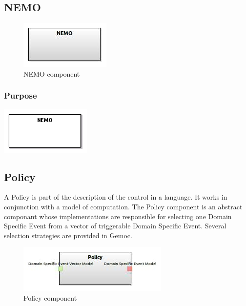 \documentclass{gemoc} %
\begin{document}
\subsection{NEMO}

\begin{figure}[htp]
	\begin{center}
	\includegraphics*[trim=0.0cm 0.0cm 0cm 0.0cm, clip=true, scale=1.0]{../images/generated/Generated_NEMO.jpg}
	\caption{NEMO component}
	\end{center}
\end{figure}

\subsubsection{Purpose}

\begin{center}
\includegraphics*[trim=0.0cm 0.0cm 0cm 0.0cm, clip=true]{../images/generated/Generated_NEMO.png}
\end{center}



\subsection{Policy}
A Policy is part of the description of the control in a language. It works in conjunction with a model of computation.
The Policy component is an abstract componant whose implementations are responsible for selecting one Domain Specific Event from a vector of triggerable Domain Specific Event. Several selection strategies are provided in Gemoc.
\begin{figure}[htp]
	\begin{center}
	\includegraphics*[trim=0.0cm 0.0cm 0cm 0.0cm, clip=true, scale=1.0]{../images/generated/Generated_Policy.jpg}
	\caption{Policy component}
	\end{center}
\end{figure}
\end{document}
